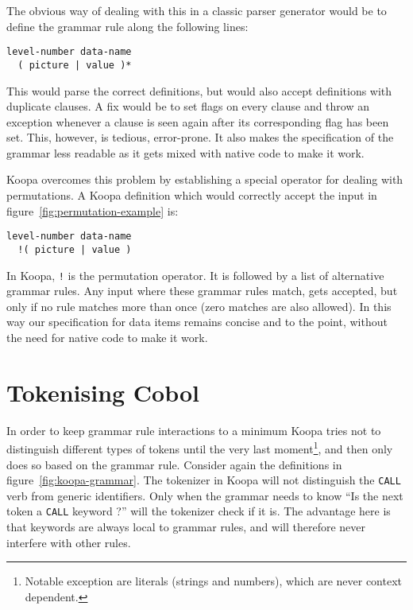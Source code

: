 \documentclass[a4paper]{article}
\begin{document}
The obvious way of dealing with this in a classic parser generator would be to define the grammar rule along the following lines:
\begin{lstlisting}[numbers=none]
level-number data-name
  ( picture | value )*
\end{lstlisting}
This would parse the correct definitions, but would also accept definitions with duplicate clauses. A fix would be to set flags on every clause and throw an exception whenever a clause is seen again after its corresponding flag has been set. This, however, is tedious, error-prone. It also makes the specification of the grammar less readable as it gets mixed with native code to make it work.

Koopa overcomes this problem by establishing a special operator for dealing with permutations. A Koopa definition which would correctly accept the input in figure~\ref{fig:permutation-example} is:
\begin{lstlisting}[numbers=none]
level-number data-name
  !( picture | value )
\end{lstlisting}
In Koopa, \lstinline|!| is the permutation operator. It is followed by a list of alternative grammar rules. Any input where these grammar rules match, gets accepted, but only if no rule matches more than once (zero matches are also allowed). In this way our specification for data items remains concise and to the point, without the need for native code to make it work.


\section{Tokenising Cobol}
\label{tokenisation}

In order to keep grammar rule interactions to a minimum Koopa tries not to distinguish different types of tokens until the very last moment\footnote{\scriptsize Notable exception are literals (strings and numbers), which are never context dependent.}, and then only does so based on the grammar rule. Consider again the definitions in figure~\ref{fig:koopa-grammar}. The tokenizer in Koopa will not distinguish the \lstinline|CALL| verb from generic identifiers. Only when the grammar needs to know ``Is the next token a \lstinline|CALL| keyword ?'' will the tokenizer check if it is. The advantage here is that keywords are always local to grammar rules, and will therefore never interfere with other rules.
\end{document}
